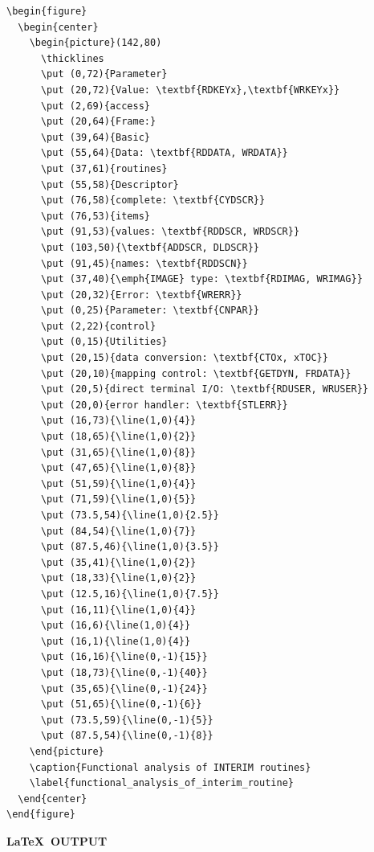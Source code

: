\documentclass[twoside,11pt]{article}
\begin{document}
\small
\begin{verbatim}
\begin{figure}
  \begin{center}
    \begin{picture}(142,80)
      \thicklines
      \put (0,72){Parameter}
      \put (20,72){Value: \textbf{RDKEYx},\textbf{WRKEYx}}
      \put (2,69){access}
      \put (20,64){Frame:}
      \put (39,64){Basic}
      \put (55,64){Data: \textbf{RDDATA, WRDATA}}
      \put (37,61){routines}
      \put (55,58){Descriptor}
      \put (76,58){complete: \textbf{CYDSCR}}
      \put (76,53){items}
      \put (91,53){values: \textbf{RDDSCR, WRDSCR}}
      \put (103,50){\textbf{ADDSCR, DLDSCR}}
      \put (91,45){names: \textbf{RDDSCN}}
      \put (37,40){\emph{IMAGE} type: \textbf{RDIMAG, WRIMAG}}
      \put (20,32){Error: \textbf{WRERR}}
      \put (0,25){Parameter: \textbf{CNPAR}}
      \put (2,22){control}
      \put (0,15){Utilities}
      \put (20,15){data conversion: \textbf{CTOx, xTOC}}
      \put (20,10){mapping control: \textbf{GETDYN, FRDATA}}
      \put (20,5){direct terminal I/O: \textbf{RDUSER, WRUSER}}
      \put (20,0){error handler: \textbf{STLERR}}
      \put (16,73){\line(1,0){4}}
      \put (18,65){\line(1,0){2}}
      \put (31,65){\line(1,0){8}}
      \put (47,65){\line(1,0){8}}
      \put (51,59){\line(1,0){4}}
      \put (71,59){\line(1,0){5}}
      \put (73.5,54){\line(1,0){2.5}}
      \put (84,54){\line(1,0){7}}
      \put (87.5,46){\line(1,0){3.5}}
      \put (35,41){\line(1,0){2}}
      \put (18,33){\line(1,0){2}}
      \put (12.5,16){\line(1,0){7.5}}
      \put (16,11){\line(1,0){4}}
      \put (16,6){\line(1,0){4}}
      \put (16,1){\line(1,0){4}}
      \put (16,16){\line(0,-1){15}}
      \put (18,73){\line(0,-1){40}}
      \put (35,65){\line(0,-1){24}}
      \put (51,65){\line(0,-1){6}}
      \put (73.5,59){\line(0,-1){5}}
      \put (87.5,54){\line(0,-1){8}}
    \end{picture}
    \caption{Functional analysis of INTERIM routines}
    \label{functional_analysis_of_interim_routine}
  \end{center}
\end{figure}
\end{verbatim}
\normalsize

\newpage

\begin{center}
  \textbf{\LaTeX\ OUTPUT}
\end{center}
\end{document}
